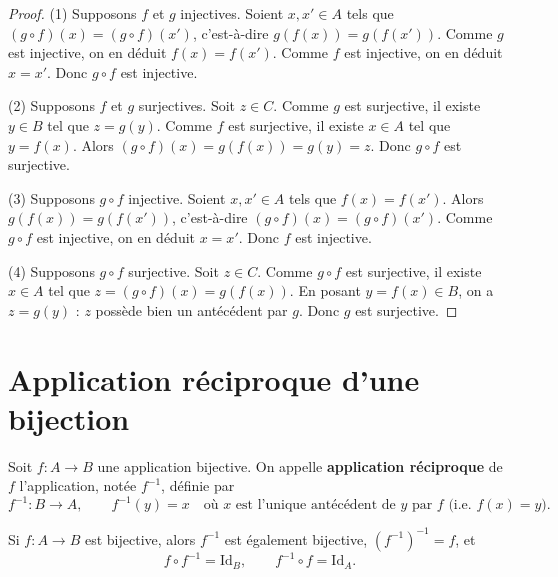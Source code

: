 \documentclass[a4paper,12pt,openany]{book}
\begin{document}
\begin{proof}
(1) Supposons $f$ et $g$ injectives. Soient $x,x'\in A$ tels que $(g\circ
f)(x)=(g\circ f)(x')$, c'est-à-dire $g(f(x))=g(f(x'))$. Comme $g$ est
injective, on en déduit $f(x)=f(x')$. Comme $f$ est injective, on en déduit
$x=x'$. Donc $g\circ f$ est injective.

(2) Supposons $f$ et $g$ surjectives. Soit $z\in C$. Comme $g$ est
surjective, il existe $y\in B$ tel que $z=g(y)$. Comme $f$ est surjective,
il existe $x\in A$ tel que $y=f(x)$. Alors
$(g\circ f)(x) = g(f(x)) = g(y) = z$. Donc $g\circ f$ est surjective.

(3) Supposons $g\circ f$ injective. Soient $x,x'\in A$ tels que $f(x)=f(x')$.
Alors $g(f(x))=g(f(x'))$, c'est-à-dire $(g\circ f)(x)=(g\circ f)(x')$. Comme
$g\circ f$ est injective, on en déduit $x=x'$. Donc $f$ est injective.

(4) Supposons $g\circ f$ surjective. Soit $z\in C$. Comme $g\circ f$ est
surjective, il existe $x\in A$ tel que $z=(g\circ f)(x)=g(f(x))$. En posant
$y=f(x)\in B$, on a $z=g(y)$ : $z$ possède bien un antécédent par $g$. Donc
$g$ est surjective.
\end{proof}


\section{Application réciproque d'une bijection}


\begin{definition}[3.8]
Soit $f : A \to B$ une application bijective. On appelle \textbf{application
réciproque} de $f$ l'application, notée $f^{-1}$, définie par
\[
f^{-1} : B \longrightarrow A, \qquad f^{-1}(y) = x \quad \text{où } x
\text{ est l'unique antécédent de } y \text{ par } f \text{ (i.e. } f(x)=y).
\]
\end{definition}

\begin{theoreme}[3.1]
Si $f : A \to B$ est bijective, alors $f^{-1}$ est également bijective,
$(f^{-1})^{-1} = f$, et
\[
f \circ f^{-1} = \mathrm{Id}_B, \qquad f^{-1}\circ f = \mathrm{Id}_A.
\]
\end{theoreme}
\end{document}
